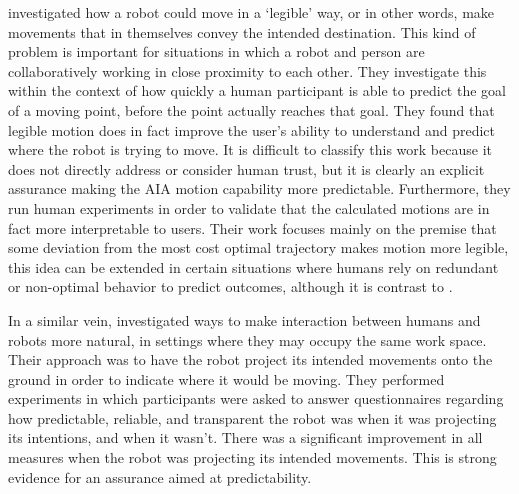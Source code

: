 \citet{Dragan2013-wd} investigated how a robot could move in a `legible' way, or in other words, make movements that in themselves convey the intended destination. This kind of problem is important for situations in which a robot and person are collaboratively working in close proximity to each other. They investigate this within the context of how quickly a human participant is able to predict the goal of a moving point, before the point actually reaches that goal. They found that legible motion does in fact improve the user's ability to understand and predict where the robot is trying to move. It is difficult to classify this work because it does not directly address or consider human trust, but it is clearly an explicit assurance making the AIA motion capability more predictable. Furthermore, they run human experiments in order to validate that the calculated motions are in fact more interpretable to users. Their work focuses mainly on the premise that some deviation from the most cost optimal trajectory makes motion more legible, this idea can be extended in certain situations where humans rely on redundant or non-optimal behavior to predict outcomes, although it is contrast to \citet{Wu2016-ei}.

In a similar vein, \citet{Chadalavada2015-wx} investigated ways to make interaction between humans and robots more natural, in settings where they may occupy the same work space. Their approach was to have the robot project its intended movements onto the ground in order to indicate where it would be moving. They performed experiments in which participants were asked to answer questionnaires regarding how predictable, reliable, and transparent the robot was when it was projecting its intentions, and when it wasn't. There was a significant improvement in all measures when the robot was projecting its intended movements. This is strong evidence for an assurance aimed at predictability.

